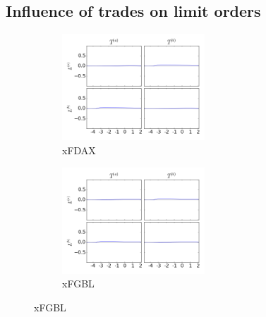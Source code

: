 \documentclass[a4paper,11pt]{article}
\begin{document}
\subsection{Influence of trades on limit orders}
\label{TL}
\begin{figure}[H]
        \begin{subfigure}[b]{0.45\textwidth}
                \includegraphics[width=\textwidth,height=40mm]{xFDAXPA_PB_TA_TB_LA_LB_CA_CB__TATB-_LALBcausality.png}
                \caption{xFDAX}
        \end{subfigure}
        \begin{subfigure}[b]{0.45\textwidth}
                \includegraphics[width=\textwidth,height=40mm]{xFGBLPA_PB_TA_TB_LA_LB_CA_CB__TATB-_LALBcausality.png}
                \caption{xFGBL}
        \end{subfigure}
\end{figure}
\end{document}
